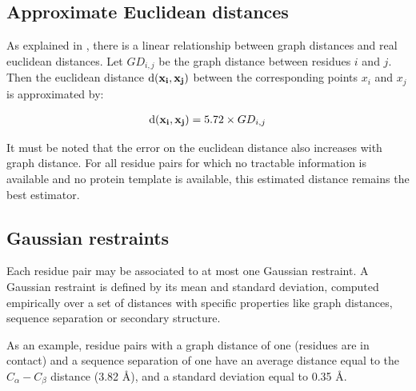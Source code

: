   \subsection{Approximate Euclidean distances}

    As explained in \cite{pietal2015gdfuzz3d}, there is a linear relationship
    between graph distances and real euclidean distances.
    Let $GD_{i,j}$ be the graph distance between residues $i$ and $j$. Then
    the euclidean distance $\operatorname{d}(\mathbf{x_i},\mathbf{x_j})$ between the corresponding
    points $x_i$ and $x_j$ is approximated by:

    \begin{align}
        \operatorname{d}(\mathbf{x_i},\mathbf{x_j}) = 5.72 \times GD_{i,j}
    \end{align}

    It must be noted that the error on the euclidean distance also increases
    with graph distance. For all residue pairs for which no tractable information
    is available and no protein template is available,
    this estimated distance remains the best estimator.

  \subsection{Gaussian restraints}

    Each residue pair may be associated to at most one Gaussian restraint.
    A Gaussian restraint is defined by its mean and standard deviation,
    computed empirically over a set of distances with specific properties
    like graph distances, sequence separation or secondary structure.

    As an example, residue pairs with a graph distance of one (residues are
    in contact) and a sequence separation of one have an average distance equal
    to the $C_{\alpha}-C_{\beta}$ distance (3.82 \AA{}), and a standard deviation
    equal to 0.35 \AA{}.


